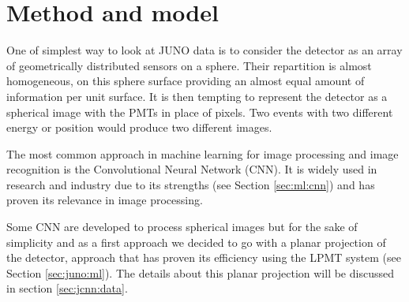 \documentclass[../main.tex]{subfiles}
\begin{document}
\section{Method and model}

One of simplest way to look at JUNO data is to consider the detector as an array of geometrically distributed sensors on a sphere. Their repartition is almost homogeneous, on this sphere surface providing an almost equal amount of information per unit surface. It is then tempting to represent the detector as a spherical image with the PMTs in place of pixels. Two events with two different energy or position would produce two different images.

The most common approach in machine learning for image processing and image recognition is the Convolutional Neural Network (CNN). It is widely used in research and industry \cite{simonyan_very_2015, ciresan_multi-column_2012, abbasi_convolutional_2021, maksimovic_cnns_2021} due to its strengths (see Section \ref{sec:ml:cnn}) and has proven its relevance in image processing.

Some CNN are developed to process spherical images \cite{cohen_spherical_2018} but for the sake of simplicity and as a first approach we decided to go with a planar projection of the detector, approach that has proven its efficiency using the LPMT system (see Section \ref{sec:juno:ml}). The details about this planar projection will be discussed in section \ref{sec:jcnn:data}.
\end{document}
